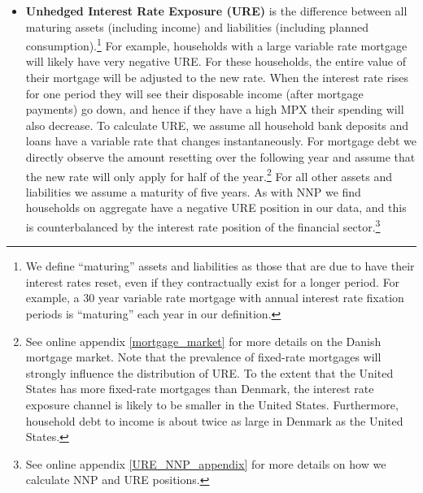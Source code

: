 \documentclass[titlepage]{\econtex}\newcommand{\texname}{ConsumptionHeterogeneity}
\begin{document}
\begin{itemize}
		\item \textbf{Unhedged Interest Rate Exposure (URE)} is the difference between all maturing assets (including income) and liabilities (including planned consumption).\footnote{We define ``maturing'' assets and liabilities as those that are due to have their interest rates reset, even if they contractually exist for a longer period. For example, a 30 year variable rate mortgage with annual interest rate fixation periods is ``maturing'' each year in our definition.} For example, households with a large variable rate mortgage will likely have very negative URE. For these households, the entire value of their mortgage will be adjusted to the new rate. When the interest rate rises for one period they will see their disposable income (after mortgage payments) go down, and hence if they have a high MPX their spending will also decrease. To calculate URE, we assume all household bank deposits and loans have a variable rate that changes instantaneously. For mortgage debt we directly observe the amount resetting over the following year and assume that the new rate will only apply for half of the year.\footnote{See online appendix \ref{mortgage_market} for more details on the Danish mortgage market. Note that the prevalence of fixed-rate mortgages will strongly influence the distribution of URE. To the extent that the United States has more fixed-rate mortgages than Denmark, the interest rate exposure channel is likely to be smaller in the United States. Furthermore, household debt to income is about twice as large in Denmark as the United States.} For all other assets and liabilities we assume a maturity of five years. As with NNP we find households on aggregate have a negative URE position in our data, and this is counterbalanced by the interest rate position of the financial sector.\footnote{See online appendix \ref{URE_NNP_appendix} for more details on how we calculate NNP and URE positions.}
	\end{itemize}
	
\end{document}
